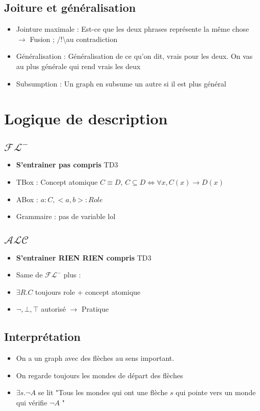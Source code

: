 \documentclass{article}
\theoremstyle{plain}%
\theoremstyle{definition}
\theoremstyle{remark}
\begin{document}
\subsection{Joiture et généralisation}
\begin{itemize}
    \item Jointure maximale : Est-ce que les deux phrases représente la même chose $\rightarrow$ Fusion ; /!\textbackslash au contradiction
    \item Généralisation : Généralisation de ce qu'on dit, vrais pour les deux. On vas au plus générale qui rend vrais les deux
    \item Subsumption : Un graph en subsume un autre si il est plus général
\end{itemize}

\section{Logique de description}
\subsection{$ \mathcal{FL}^- $ }
\begin{itemize}
    \item \textbf{S'entrainer pas compris} TD3
    \item TBox : Concept atomique $ C \equiv D $, $ C \subseteq D \Leftrightarrow \forall x, C(x) \to D(x)$ 
    \item ABox : $ a : C, <a,b> : Role $ 
    \item Grammaire : pas de variable lol
\end{itemize}
\subsection{$ \mathcal{ALC} $ }
\begin{itemize}
    \item \textbf{S'entrainer RIEN RIEN compris} TD3
    \item Same de $ \mathcal{FL}^- $ plus : 
    \item $ \exists R.C $ toujours role + concept atomique 
    \item $ \neg , \bot , \top  $ autorisé $\rightarrow$ Pratique
\end{itemize}

\subsection{Interprétation}
\begin{itemize}
    \item On a un graph avec des flèches au sens important.
    \item On regarde toujours les mondes de départ des flèches
    \item $ \exists s. \neg A $ se lit "Tous les mondes qui ont une flèche $ s $ qui pointe vers un monde qui vérifie $ \neg A $ "
\end{itemize}
\end{document}

